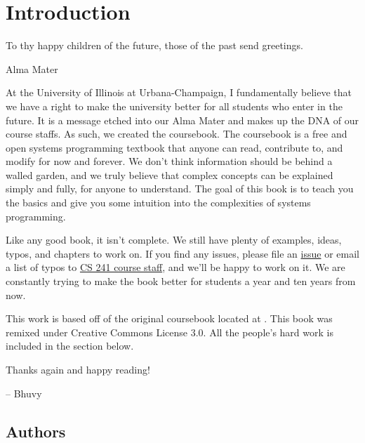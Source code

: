 \chapter{Introduction}

\epigraph{To thy happy children of the future, those of the past send greetings.}{Alma Mater}

At the University of Illinois at Urbana-Champaign, I fundamentally believe that we have a right to make the university better for all students who enter in the future.
It is a message etched into our Alma Mater and makes up the DNA of our course staffs.
As such, we created the coursebook.
The coursebook is a free and open systems programming textbook that anyone can read, contribute to, and modify for now and forever.
We don't think information should be behind a walled garden, and we truly believe that complex concepts can be explained simply and fully, for anyone to understand.
The goal of this book is to teach you the basics and give you some intuition into the complexities of systems programming.

Like any good book, it isn't complete.
We still have plenty of examples, ideas, typos, and chapters to work on.
If you find any issues, please file an \href{https://github.com/illinois-cs241/coursebook/issues}{issue} or email a list of typos to \href{http://cs241.cs.illinois.edu/staff}{CS 241 course staff}, and we'll be happy to work on it.
We are constantly trying to make the book better for students a year and ten years from now.

This work is based off of the original coursebook located at .
This book was remixed under Creative Commons License 3.0.
All the people's hard work is included in the section below.

Thanks again and happy reading!

-- Bhuvy

\section{Authors}



